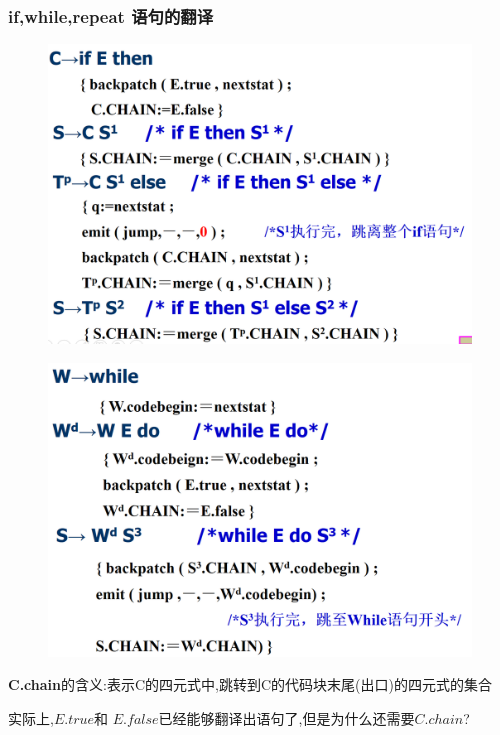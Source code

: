 \documentclass[UTF8,a4paper]{ctexart}
\begin{document}
 \subsubsection{if,while,repeat 语句的翻译}
 \begin{figure}[H]
  \centering
  \includegraphics[scale = 0.3]{assets/CompilerConstructionPrinciples_d0192.png}
 \end{figure}

 \begin{figure}[H]
  \centering
  \includegraphics[scale = 0.3]{assets/CompilerConstructionPrinciples_ba2f4.png}
 \end{figure}

 \textbf{C.chain}的含义:表示C的四元式中,跳转到C的代码块末尾(出口)的四元式的集合

 实际上,$E.true$和 $E.false$已经能够翻译出语句了,但是为什么还需要$C.chain$?
\end{document}
